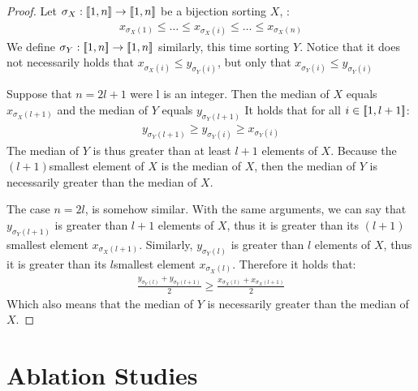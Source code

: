 \begin{proof}
    Let $\sigma_X:[\![1,n]\!]\rightarrow[\![1,n]\!]$ be a bijection sorting $X$, \ie:
    \begin{align}
        x_{\sigma_X(1)}\leqslant\dots\leqslant x_{\sigma_X(i)}\leqslant\dots\leqslant x_{\sigma_X(n)}
    \end{align}
    We define $\sigma_Y:[\![1,n]\!]\rightarrow[\![1,n]\!]$ similarly, this time sorting $Y$. Notice that it does not necessarily holds that $x_{\sigma_X(i)}\leqslant y_{\sigma_Y(i)}$, but only that $x_{\sigma_Y(i)}\leqslant y_{\sigma_Y(i)}$ 
    
    Suppose that $n=2l+1$ were l is an integer. Then the median of $X$ equals $x_{\sigma_X(l+1)}$ and the median of $Y$ equals $y_{\sigma_Y(l+1)}$ 
    It holds that for all $i\in[\![1,l+1]\!]$:
    \begin{align}
        y_{\sigma_Y(l+1)}\geqslant y_{\sigma_Y(i)}\geqslant x_{\sigma_Y(i)}
    \end{align}
    The median of $Y$ is thus greater than at least $l+1$ elements of $X$. Because the $(l+1)$\ith smallest element of $X$ is the median of $X$, then the median of $Y$ is necessarily greater than the median of $X$.
    
    The case $n=2l$, is somehow similar. With the same arguments, we can say that $y_{\sigma_Y(l+1)}$ is greater than $l+1$ elements of $X$, thus it is greater than its $(l+1)$\ith smallest element $x_{\sigma_X(l+1)}$. Similarly, $y_{\sigma_Y(l)}$ is greater than $l$ elements of $X$, thus it is greater than its $l$\ith smallest element $x_{\sigma_X(l)}$. Therefore it holds that:
    \begin{align}
        \frac{y_{\sigma_Y(l)}+y_{\sigma_Y(l+1)}}{2}\geqslant\frac{x_{\sigma_X(l)}+x_{\sigma_X(l+1)}}{2}
    \end{align}
    Which also means that the median of $Y$ is necessarily greater than the median of $X$.
\end{proof}

\section{Ablation Studies}

\pagebreak